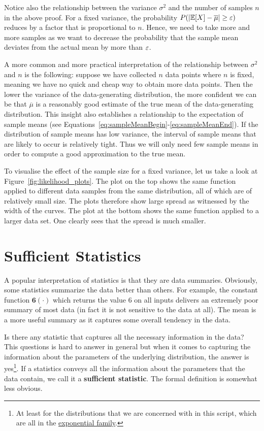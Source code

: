 Notice also the relationship between the variance $ \sigma^{2} $ and the number of samples $ n $ in the above proof. For a fixed variance, the
probability $ P(|\mathbb{E}[X] - \overline{\mu}| \geq \varepsilon) $ reduces by a factor that is proportional to $ n $. Hence, we need to take
more and more samples as we want to decrease the probability that the sample mean deviates from the actual mean by more than $ \varepsilon $. 

A more common and more practical interpretation of the relationship between $ \sigma^{2} $ and $ n $ is the following: suppose we have collected $ n $ data
points where $ n $ is fixed, meaning we have no quick and cheap way to obtain more data points. Then the lower the variance of the data-generating distribution, 
the more confident we can be
that $ \overline{\mu} $ is a reasonably good estimate of the true mean of the data-generating distribution. This insight also establishes a relationship to
the expectation of sample means (see Equations~\eqref{eq:sampleMeanBegin}-\eqref{eq:sampleMeanEnd}). If the distribution of sample means has low variance, the
interval of sample means that are likely to occur is relatively tight. Thus we will only need few sample means in order to compute a good approximation to
the true mean.

To visualise the effect of the sample size for a fixed variance, 
let us take a look at Figure~\ref{fig:likelihood_plots}. The plot on the top shows the same function applied
to different data samples from the same distribution, all of which are of relatively small size. 
The plots therefore show large spread as witnessed by the width of the curves. The 
plot at the bottom shows the same function applied to a larger data set. One clearly sees that the spread is much smaller.

\section{Sufficient Statistics}\label{sec:sufficientStats}

A popular interpretation of statistics is that they are data summaries. Obviously, some statistics summarize
the data better than others. For example, the constant function $ \mathbf{6}(\cdot) $ which returns the
value 6 on all inputs delivers an extremely poor summary of most data (in fact it is not sensitive to the
data at all). The mean is a more useful summary as it captures some overall tendency in the data. 

Is there any statistic that captures all the necessary information in the data? This questions is hard
to answer in general but when it comes to capturing the information about the parameters of the
underlying distribution, the answer is yes\footnote{At least for the distributions that we are 
concerned with in this script, which are all in the \href{https://en.wikipedia.org/wiki/Exponential_family}{exponential family}.}. If a statistics
conveys all the information about the parameters that the data contain, we call it a \textbf{sufficient
statistic}. The formal definition is somewhat less obvious.

